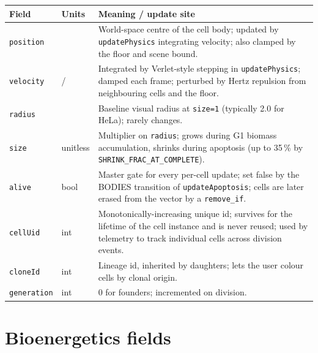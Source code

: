 \documentclass[11pt,letterpaper,twoside,openany]{book}
\newcommand{\code}[1]{\texttt{#1}}
\newcommand{\realsec}{\text{real-s}}
\newcommand{\wu}{\text{wu}}
\begin{document}
\begin{longtable}{p{3.3cm} p{2.2cm} p{7.5cm}}
\toprule
\textbf{Field} & \textbf{Units} & \textbf{Meaning / update site}\\ \midrule
\code{position}    & \wu    & World-space centre of the cell body; updated by \code{updatePhysics} integrating velocity; also clamped by the floor and scene bound.\\
\code{velocity}    & \wu/\realsec & Integrated by Verlet-style stepping in \code{updatePhysics}; damped each frame; perturbed by Hertz repulsion from neighbouring cells and the floor.\\
\code{radius}      & \wu    & Baseline visual radius at \code{size=1} (typically 2.0 for HeLa); rarely changes.\\
\code{size}        & unitless & Multiplier on \code{radius}; grows during G1 biomass accumulation, shrinks during apoptosis (up to 35\,\% by \code{SHRINK\_FRAC\_AT\_COMPLETE}).\\
\code{alive}       & bool   & Master gate for every per-cell update; set false by the BODIES transition of \code{updateApoptosis}; cells are later erased from the vector by a \code{remove\_if}.\\
\code{cellUid}     & int    & Monotonically-increasing unique id; survives for the lifetime of the cell instance and is never reused; used by telemetry to track individual cells across division events.\\
\code{cloneId}     & int    & Lineage id, inherited by daughters; lets the user colour cells by clonal origin.\\
\code{generation}  & int    & 0 for founders; incremented on division.\\
\bottomrule
\end{longtable}

\section{Bioenergetics fields}
\end{document}
